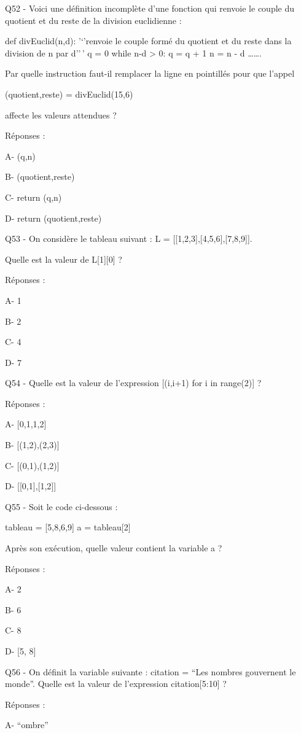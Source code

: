 \documentclass[
]{book}
\begin{document}
Q52 - Voici une définition incomplète d'une fonction qui renvoie le couple du quotient et du reste de la division euclidienne :

def divEuclid(n,d):
'`'renvoie le couple formé du quotient et du reste dans la division de n par d''\,'
q = 0
while n-d \textgreater{} 0:
q = q + 1
n = n - d
\ldots\ldots.

Par quelle instruction faut-il remplacer la ligne en pointillés pour que l'appel

(quotient,reste) = divEuclid(15,6)

affecte les valeurs attendues ?

Réponses :

A- (q,n)

B- (quotient,reste)

C- return (q,n)

D- return (quotient,reste)

Q53 - On considère le tableau suivant : L = {[}{[}1,2,3{]},{[}4,5,6{]},{[}7,8,9{]}{]}.

Quelle est la valeur de L{[}1{]}{[}0{]} ?

Réponses :

A- 1

B- 2

C- 4

D- 7

Q54 - Quelle est la valeur de l'expression {[}(i,i+1) for i in range(2){]} ?

Réponses :

A- {[}0,1,1,2{]}

B- {[}(1,2),(2,3){]}

C- {[}(0,1),(1,2){]}

D- {[}{[}0,1{]},{[}1,2{]}{]}

Q55 - Soit le code ci-dessous :

tableau = {[}5,8,6,9{]}
a = tableau{[}2{]}

Après son exécution, quelle valeur contient la variable a ?

Réponses :

A- 2

B- 6

C- 8

D- {[}5, 8{]}

Q56 - On définit la variable suivante : citation = ``Les nombres gouvernent le monde''. Quelle est la valeur de l'expression citation{[}5:10{]} ?

Réponses :

A- ``ombre''
\end{document}
